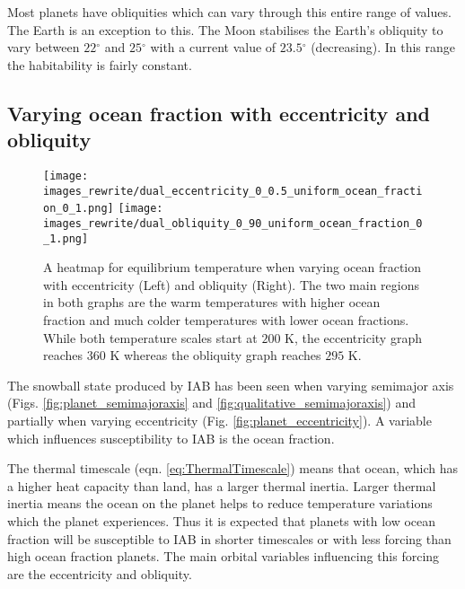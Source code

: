 \documentclass[12pt, onecolumn]{revtex4-2}    %
\newcommand{\degrees}{\ensuremath{^{\circ}}}
\begin{document}
Most planets have obliquities which can vary through this entire range of values.
The Earth is an exception to this. 
The Moon stabilises the Earth's obliquity to vary between $22\degrees$ and $25\degrees$ with a current value of $23.5\degrees$ (decreasing).
In this range the habitability is fairly constant.


\subsection{Varying ocean fraction with eccentricity and obliquity} \label{ssec:qualitative_oceanfraction}
%
\begin{figure}[t]
  \texttt{[image: images\_rewrite/dual\_eccentricity\_0\_0.5\_uniform\_ocean\_fraction\_0\_1.png]}
  \texttt{[image: images\_rewrite/dual\_obliquity\_0\_90\_uniform\_ocean\_fraction\_0\_1.png]}
  \caption{
    A heatmap for equilibrium temperature when varying ocean fraction with eccentricity (Left) and obliquity (Right).
    The two main regions in both graphs are the warm temperatures with higher ocean fraction and much colder temperatures with lower ocean fractions.
    While both temperature scales start at $200$ K, the eccentricity graph reaches $360$ K whereas the obliquity graph reaches $295$ K.
  }
  \label{fig:qualitative_oceanfraction}
\end{figure}

The snowball state produced by IAB has been seen when varying semimajor axis (Figs. \ref{fig:planet_semimajoraxis} and \ref{fig:qualitative_semimajoraxis}) and partially when varying eccentricity (Fig. \ref{fig:planet_eccentricity}).
A variable which influences susceptibility to IAB is the ocean fraction.

The thermal timescale (eqn. \eqref{eq:ThermalTimescale}) means that ocean, which has a higher heat capacity than land, has a larger thermal inertia.
Larger thermal inertia means the ocean on the planet helps to reduce temperature variations which the planet experiences.
Thus it is expected that planets with low ocean fraction will be susceptible to IAB in shorter timescales or with less forcing than high ocean fraction planets.
The main orbital variables influencing this forcing are the eccentricity and obliquity.
\end{document}
